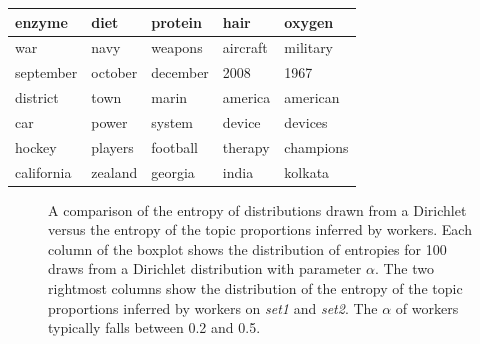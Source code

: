 \begin{table}
{\begin{tabular}{|lllll}
  enzyme & diet & protein & hair & oxygen \\ \hline 
  war & navy & weapons & aircraft & military \\ \hline 
  september & october & december & 2008 & 1967 \\ \hline 
  district & town & marin & america & american \\ \hline 
  car & power & system & device & devices \\ \hline 
  hockey & players & football & therapy & champions \\ \hline 
  california & zealand & georgia & india & kolkata \\
\end{tabular}
}
\vspace{0.2in}
\end{table}

\begin{figure}
\centering
{}%

\caption{A comparison of the entropy of distributions drawn from a
  Dirichlet versus the entropy of the topic proportions inferred by
  workers.  Each column of the boxplot shows the distribution of
  entropies for 100 draws from a Dirichlet distribution with parameter
  $\alpha$.  The two rightmost columns show the distribution of the
  entropy of the topic proportions inferred by workers on \emph{set1}
  and \emph{set2}.  The $\alpha$ of workers typically falls between 0.2
  and 0.5.}

\label{fig:entropy}
\end{figure}

